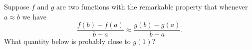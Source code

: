 \documentclass{ximera}
\begin{document}
\begin{problem}

  Suppose $f$ and $g$ are two functions with the remarkable property
  that whenever $a \approx b$ we have
  \[
  \frac{f(b) - f(a)}{b-a} \approx \frac{g(b) - g(a)}{b-a}.
  \]
  What quantity below is probably close to $g(1)$?
  \begin{multipleChoice}
  \end{multipleChoice}
\end{problem}
\end{document}
